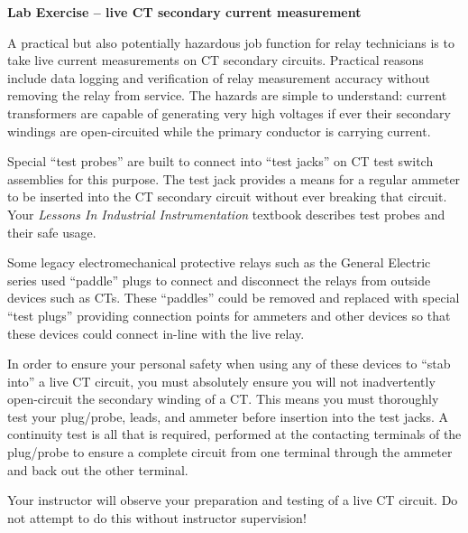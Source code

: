 \noindent
{\bf Lab Exercise -- live CT secondary current measurement}

\vskip 5pt

A practical but also potentially hazardous job function for relay technicians is to take live current measurements on CT secondary circuits.  Practical reasons include data logging and verification of relay measurement accuracy without removing the relay from service.  The hazards are simple to understand: current transformers are capable of generating very high voltages if ever their secondary windings are open-circuited while the primary conductor is carrying current.

\vskip 10pt

Special ``test probes'' are built to connect into ``test jacks'' on CT test switch assemblies for this purpose.  The test jack provides a means for a regular ammeter to be inserted into the CT secondary circuit without ever breaking that circuit.  Your {\it Lessons In Industrial Instrumentation} textbook describes test probes and their safe usage.

\vskip 10pt

Some legacy electromechanical protective relays such as the General Electric series used ``paddle'' plugs to connect and disconnect the relays from outside devices such as CTs.  These ``paddles'' could be removed and replaced with special ``test plugs'' providing connection points for ammeters and other devices so that these devices could connect in-line with the live relay. 

\vskip 10pt

In order to ensure your personal safety when using any of these devices to ``stab into'' a live CT circuit, you must absolutely ensure you will not inadvertently open-circuit the secondary winding of a CT.  This means you must thoroughly test your plug/probe, leads, and ammeter before insertion into the test jacks.  A continuity test is all that is required, performed at the contacting terminals of the plug/probe to ensure a complete circuit from one terminal through the ammeter and back out the other terminal.

\vskip 10pt

Your instructor will observe your preparation and testing of a live CT circuit.  Do not attempt to do this without instructor supervision!












